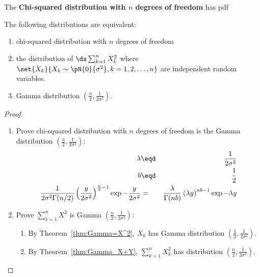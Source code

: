 \begin{definition}
The {\bf Chi-squared distribution with $n$ degrees of freedom} has pdf
\end{definition}

\begin{theorem}
The following distributions are equivalent:
\begin{enumerate}
  \item chi-squared distribution with $n$ degrees of freedom
  \item the distribution of $\ds \sum_{k=1}^n X_k^2$ where
        $\set{X_k}{X_k\sim\pN{0}{\sigma^2}, k=1,2,\ldots,n}$
        are independent random variables.
  \item Gamma distribution $\left(\frac{n}{2}, \frac{1}{2\sigma^2} \right)$.
\end{enumerate}
\end{theorem}
\begin{proof}
\begin{enumerate}
\item Prove chi-squared distribution with $n$ degrees of freedom is the 
      Gamma distribution $\left(\frac{n}{2}, \frac{1}{2\sigma^2} \right)$:
  \begin{eqnarray*}
    \lambda &\eqd& \frac{1}{2\sigma^2} \\
    b       &\eqd& \frac{1}{2} \\
    \frac{1}{2\sigma^2\Gamma(n/2)} 
                 \left(\frac{y}{2\sigma^2}\right)^{\frac{n}{2}-1}
                 \exp{-\frac{y}{2\sigma^2}}
      &=& \frac{\lambda}{\Gamma(nb)} 
          \left(\lambda y \right)^{nb-1}
          \exp{-\lambda y}
  \end{eqnarray*}

\item Prove $\sum_{k=1}^n X^2$ is Gamma $\left(\frac{n}{2}, \frac{1}{2\sigma^2} \right)$:
  \begin{enumerate}
    \item By Theorem~\ref{thm:Gamma=X^2}, $X_k$ has Gamma distribution 
          $\left(\frac{1}{2}, \frac{1}{2\sigma^2} \right)$.
    \item By Theorem~\ref{thm:Gamma_X+Y}, $\sum_{k=1}^n X_k^2$ has 
          distribution $\left(\frac{n}{2}, \frac{1}{2\sigma^2} \right)$.
  \end{enumerate}
\end{enumerate}
\end{proof}

